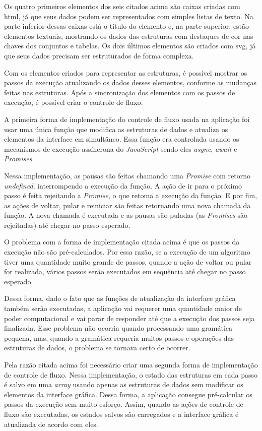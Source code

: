 Os quatro primeiros elementos dos seis citados acima são caixas criadas com \gls{html}, já que seus dados podem ser representados com simples listas de texto. Na parte inferior dessas caixas está o título do elemento e, na parte superior, estão elementos textuais, mostrando os dados das estruturas com destaques de cor nas chaves dos conjuntos e tabelas. Os dois últimos elementos são criados com \gls{svg}, já que seus dados precisam ser estruturados de forma complexa.

Com os elementos criados para representar as estruturas, é possível mostrar os passos da execução atualizando os dados desses elementos, conforme as mudanças feitas nas estruturas. Após a sincronização dos elementos com os passos de execução, é possível criar o controle de fluxo.

A primeira forma de implementação do controle de fluxo usada na aplicação foi usar uma única função que modifica as estruturas de dados e atualiza os elementos da interface em simultâneo. Essa função era controlada usando os mecanismos de execução assíncrona do \textit{JavaScript} sendo eles \textit{async}, \textit{await} e \textit{Promises}.

Nessa implementação, as pausas são feitas chamando uma \textit{Promise} com retorno \textit{undefined}, interrompendo a execução da função. A ação de ir para o próximo passo é feita rejeitando a \textit{Promise}, o que retoma a execução da função. E por fim, as ações de voltar, pular e reiniciar são feitas retornando uma nova chamada da função. A nova chamada é executada e as pausas são puladas (as \textit{Promises} são rejeitadas) até chegar no passo esperado.

O problema com a forma de implementação citada acima é que os passos da execução não são pré-calculados. Por essa razão, se a execução de um algoritmo tiver uma quantidade muito grande de passos, quando a ação de voltar ou pular for realizada, vários passos serão executados em sequência até chegar no passo esperado.

Dessa forma, dado o fato que as funções de atualização da interface gráfica também serão executadas, a aplicação vai requerer uma quantidade maior de poder computacional e vai parar de responder até que a execução dos passos seja finalizada. Esse problema não ocorria quando processando uma gramática pequena, mas, quando a gramática requeria muitos passos e operações das estruturas de dados, o problema se tornava certo de ocorrer.

Pela razão citada acima foi necessário criar uma segunda forma de implementação de controle de fluxo. Nessa implementação, o estado das estruturas em cada passo é salvo em uma \textit{array} usando apenas as estruturas de dados sem modificar os elementos da interface gráfica. Dessa forma, a aplicação consegue pré-calcular os passos da execução sem muito esforço. Assim, quando as ações de controle de fluxo são executadas, os estados salvos são carregados e a interface gráfica é atualizada de acordo com eles.

